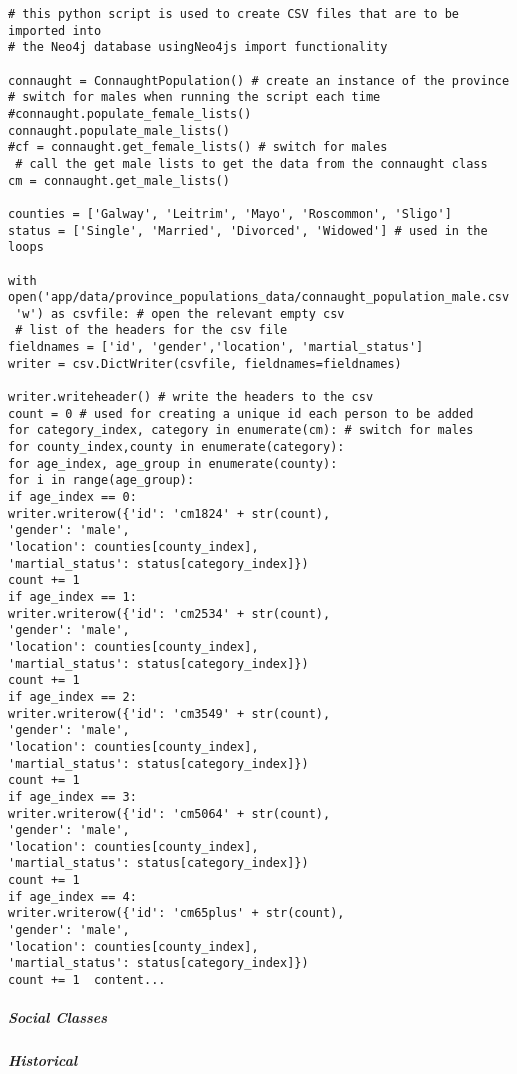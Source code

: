 \begin{verbatim}
# this python script is used to create CSV files that are to be imported into
# the Neo4j database usingNeo4js import functionality

connaught = ConnaughtPopulation() # create an instance of the province
# switch for males when running the script each time
#connaught.populate_female_lists() 
connaught.populate_male_lists()
#cf = connaught.get_female_lists() # switch for males
 # call the get male lists to get the data from the connaught class
cm = connaught.get_male_lists()

counties = ['Galway', 'Leitrim', 'Mayo', 'Roscommon', 'Sligo']
status = ['Single', 'Married', 'Divorced', 'Widowed'] # used in the loops

with open('app/data/province_populations_data/connaught_population_male.csv',
 'w') as csvfile: # open the relevant empty csv
 # list of the headers for the csv file
fieldnames = ['id', 'gender','location', 'martial_status'] 
writer = csv.DictWriter(csvfile, fieldnames=fieldnames)

writer.writeheader() # write the headers to the csv
count = 0 # used for creating a unique id each person to be added
for category_index, category in enumerate(cm): # switch for males
for county_index,county in enumerate(category):
for age_index, age_group in enumerate(county):
for i in range(age_group):
if age_index == 0:
writer.writerow({'id': 'cm1824' + str(count),
'gender': 'male',
'location': counties[county_index],
'martial_status': status[category_index]})
count += 1
if age_index == 1:
writer.writerow({'id': 'cm2534' + str(count),
'gender': 'male',
'location': counties[county_index],
'martial_status': status[category_index]})
count += 1
if age_index == 2:
writer.writerow({'id': 'cm3549' + str(count),
'gender': 'male',
'location': counties[county_index],
'martial_status': status[category_index]})
count += 1
if age_index == 3:
writer.writerow({'id': 'cm5064' + str(count),
'gender': 'male',
'location': counties[county_index],
'martial_status': status[category_index]})
count += 1
if age_index == 4:
writer.writerow({'id': 'cm65plus' + str(count),
'gender': 'male',
'location': counties[county_index],
'martial_status': status[category_index]})
count += 1	content...
\end{verbatim}
\subparagraph{Social Classes}
\subparagraph{Historical}
